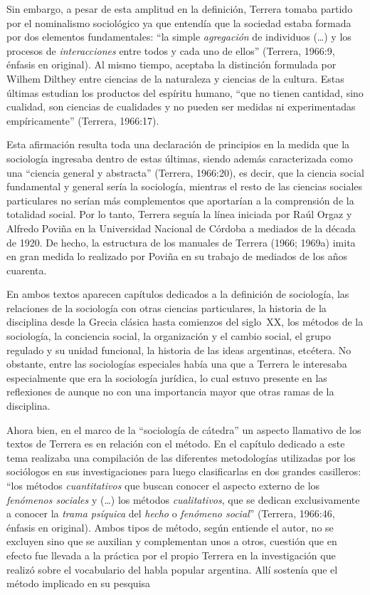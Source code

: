 Sin embargo, a pesar de esta amplitud en la definición, Terrera tomaba partido por el nominalismo sociológico ya que entendía que la sociedad estaba formada por dos elementos fundamentales: \enquote{la simple \emph{agregación} de individuos (\dots) y los procesos de \emph{interacciones} entre todos y cada uno de ellos} (Terrera, 1966:9, énfasis en original). Al mismo tiempo, aceptaba la distinción formulada por Wilhem Dilthey entre ciencias de la naturaleza y ciencias de la cultura. Estas últimas estudian los productos del espíritu humano, \enquote{que no tienen cantidad, sino cualidad, son ciencias de cualidades y no pueden ser medidas ni experimentadas empíricamente} (Terrera, 1966:17).

Esta afirmación resulta toda una declaración de principios en la medida que la sociología ingresaba dentro de estas últimas, siendo además caracterizada como una \enquote{ciencia general y abstracta} (Terrera, 1966:20), es decir, que la ciencia social fundamental y general sería la sociología, mientras el resto de las ciencias sociales particulares no serían más complementos que aportarían a la comprensión de la totalidad social. Por lo tanto, Terrera seguía la línea iniciada por Raúl Orgaz y Alfredo Poviña en la Universidad Nacional de Córdoba a mediados de la década de 1920. De hecho, la estructura de los manuales de Terrera (1966; 1969a) imita en gran medida lo realizado por Poviña en su trabajo de mediados de los años cuarenta.

En ambos textos aparecen capítulos dedicados a la definición de sociología, las relaciones de la sociología con otras ciencias particulares, la historia de la disciplina desde la Grecia clásica hasta comienzos del siglo~XX, los métodos de la sociología, la conciencia social, la organización y el cambio social, el grupo regulado y su unidad funcional, la historia de las ideas argentinas, etcétera. No obstante, entre las sociologías especiales había una que a Terrera le interesaba especialmente que era la sociología jurídica, lo cual estuvo presente en las reflexiones de \textcite{1533-POVINA1954} aunque no con una importancia mayor que otras ramas de la disciplina.

Ahora bien, en el marco de la \enquote{sociología de cátedra} un aspecto llamativo de los textos de Terrera es en relación con el método. En el capítulo dedicado a este tema realizaba una compilación de las diferentes metodologías utilizadas por los sociólogos en sus investigaciones para luego clasificarlas en dos grandes casilleros: \enquote{los métodos \emph{cuantitativos} que buscan conocer el aspecto externo de los \emph{fenómenos sociales} y (\dots) los métodos \emph{cualitativos}, que se dedican exclusivamente a conocer la \emph{trama psíquica} del \emph{hecho} o \emph{fenómeno social}} (Terrera, 1966:46, énfasis en original). Ambos tipos de método, según entiende el autor, no se excluyen sino que se auxilian y complementan unos a otros, cuestión que en efecto fue llevada a la práctica por el propio Terrera en la investigación que realizó sobre el vocabulario del habla popular argentina. Allí sostenía que el método implicado en su pesquisa

